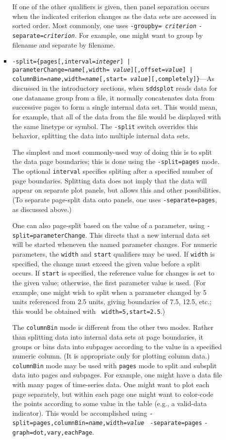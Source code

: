 \begin{itemize}
\begin{itemize}
\begin{itemize}
If one of the other qualifiers is given, then panel separation occurs when the indicated criterion
changes as the data sets are accessed in sorted order.  Most commonly, one uses {\tt -groupby={\em
criterion}} {\tt -separate={\em criterion}}.  For example, one might want to group by filename and
separate by filename.
 
  \item {\tt -split=\{pages[,interval={\em integer}] | parameterChange={\em name}[,width={\em
value}][,offset={\em value}] | columnBin={\em name},width={\em name}[,start={\em
value}][,completely]\}}---As discussed in the introductory sections, when {\tt sddsplot} reads data
for one dataname group from a file, it normally concatenates data from successive pages to form a
single internal data set.  This would mean, for example, that all of the data from the file would be
displayed with the same linetype or symbol.  The {\tt -split} switch overrides this behavior,
splitting the data into multiple internal data sets.

The simplest and most commonly-used way of doing this is to split the data page boundaries; this is
done using the {\tt -split=pages} mode.  The optional {\tt interval} specifies spliting after a
specified number of page boundaries.  Splitting data does not imply that the data will appear on
separate plot panels, but allows this and other possibilities.  (To separate page-split data onto
panels, one uses {\tt -separate=pages}, as discussed above.)

One can also page-split based on the value of a parameter, using {\tt -split=parameterChange}.  This
directs that a new internal data set will be started wheneven the named parameter changes.  For
numeric parameters, the {\tt width} and {\tt start} qualifiers may be used.  If {\tt width} is
specified, the change must exceed the given value before a split occurs.  If {\tt start} is
specified, the reference value for changes is set to the given value; otherwise, the first parameter
value is used.  (For example, one might wish to split when a parameter changed by 5 units referenced
from 2.5 units, giving boundaries of 7.5, 12.5, etc.; this would be obtained with {\tt
width=5,start=2.5}.)

The {\tt columnBin} mode is different from the other two modes.  Rather than splitting data into internal
data sets at page boundaries, it groups or bins data into subpages according to the value in a specified
numeric column.  (It is appropriate only for plotting column data.)  {\tt columnBin} mode may be used with
{\tt pages} mode to split and subsplit data into pages and subpages.  For example, one might have a data
file with many pages of time-series data.  One might want to plot each page separately, but within
each page one might want to color-code the points according to some value in the table (e.g., a valid-data
indicator). This would be accomplished using {\tt -split=pages,columnBin={\em name},width={\em value}} {\tt
-separate=pages} {\tt -graph=dot,vary,eachPage}.


\end{itemize}
\end{itemize}
\end{itemize}
